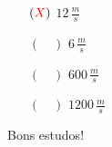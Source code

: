 \documentclass[a4paper, 12pt]{article}
\newcommand{\red}[1]{\textcolor{red}{#1}}
\begin{document}
\begin{flushleft}
\begin{itemize}
\begin{itemize}
{\begin{itemize}
\begin{equation*}
                                \end{equation*}
                        \end{itemize}}
                        \begin{itemize}
                            \item[$(\red{X})$] $12 \, \frac{m}{s}$
                            \item[$(\quad)$] $6 \, \frac{m}{s}$
                            \item[$(\quad)$] $600 \, \frac{m}{s}$
                            \item[$(\quad)$] $1200 \, \frac{m}{s}$
                        \end{itemize}
                \end{itemize}
        \end{itemize} \end{flushleft}

    \begin{flushright}
		\begin{large}
			Bons estudos!
		\end{large}
	\end{flushright}
\end{document}

